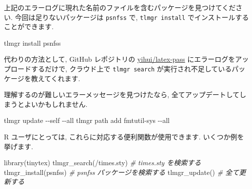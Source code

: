 \documentclass[
  xelatex,ja=standard,jafont=noto]{bxjsreport}
\newenvironment{Shaded}{\begin{snugshade}}{\end{snugshade}}
\newcommand{\AttributeTok}[1]{\textcolor[rgb]{0.77,0.63,0.00}{#1}}
\newcommand{\CommentTok}[1]{\textcolor[rgb]{0.56,0.35,0.01}{\textit{#1}}}
\newcommand{\ExtensionTok}[1]{#1}
\newcommand{\FunctionTok}[1]{\textcolor[rgb]{0.00,0.00,0.00}{#1}}
\newcommand{\NormalTok}[1]{#1}
\newcommand{\StringTok}[1]{\textcolor[rgb]{0.31,0.60,0.02}{#1}}
\begin{document}
\begin{Shaded}
\end{Shaded}

上記のエラーログに現れた名前のファイルを含むパッケージを見つけてください.
今回は足りないパッケージは \texttt{psnfss} で, \texttt{tlmgr\ install}
でインストールすることができます.

\begin{Shaded}
\begin{Highlighting}[]
\ExtensionTok{tlmgr}\NormalTok{ install psnfss}
\end{Highlighting}
\end{Shaded}

代わりの方法として, GitHub レポジトリの
\href{https://github.com/yihui/latex-pass}{yihui/latex-pass}
にエラーログをアップロードするだけで, クラウド上で
\texttt{tlmgr\ search} が実行され不足しているパッケージを教えてくれます.

理解するのが難しいエラーメッセージを見つけたなら,
全てアップデートしてしまうとよいかもしれません.

\begin{Shaded}
\begin{Highlighting}[]
\ExtensionTok{tlmgr}\NormalTok{ update }\AttributeTok{{-}{-}self} \AttributeTok{{-}{-}all}
\ExtensionTok{tlmgr}\NormalTok{ path add}
\ExtensionTok{fmtutil{-}sys} \AttributeTok{{-}{-}all}
\end{Highlighting}
\end{Shaded}

R ユーザにとっては, これらに対応する便利関数が使用できます.
いくつか例を挙げます.

\begin{Shaded}
\begin{Highlighting}[]
\FunctionTok{library}\NormalTok{(tinytex)}
\FunctionTok{tlmgr\_search}\NormalTok{(}\StringTok{\textquotesingle{}/times.sty\textquotesingle{}}\NormalTok{)   }\CommentTok{\# times.sty を検索する}
\FunctionTok{tlmgr\_install}\NormalTok{(}\StringTok{\textquotesingle{}psnfss\textquotesingle{}}\NormalTok{)      }\CommentTok{\# psnfss パッケージを検索する}
\FunctionTok{tlmgr\_update}\NormalTok{()               }\CommentTok{\# 全て更新する}
\end{Highlighting}
\end{Shaded}
\end{document}
